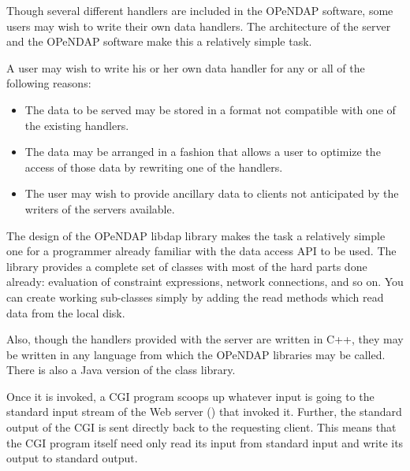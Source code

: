 \documentclass{dods-book}
\begin{document}
Though several different handlers are included in the OPeNDAP
software, some users may wish to write their own data handlers. The
architecture of the  server and the OPeNDAP software make
this a relatively simple task.

A user may wish to write his or her own data handler for any or all of
the following reasons:

\begin{itemize}
  
\item The data to be served may be stored in a format not compatible
  with one of the existing handlers.
  
\item The data may be arranged in a fashion that allows a user to
  optimize the access of those data by rewriting one of the handlers.
  
\item The user may wish to provide ancillary data to clients not
  anticipated by the writers of the servers available.

\end{itemize}

The design of the OPeNDAP libdap library makes the task a relatively
simple one for a programmer already familiar with the data access API
to be used. The library provides a complete set of classes with most
of the hard parts done already: evaluation of constraint expressions,
network connections, and so on. You can create working sub-classes
simply by adding the read methods which read data from the local disk.

Also, though the handlers provided with the server are written in C++,
they may be written in any language from which the OPeNDAP libraries
may be called. There is also a Java version of the class library.

Once it is invoked, a CGI program scoops up whatever input is going to the
standard input stream of the Web server () that invoked it.
Further, the standard output of the CGI is sent directly back to the
requesting client. This means that the CGI program itself need only read its
input from standard input and write its output to standard output.
\end{document}
